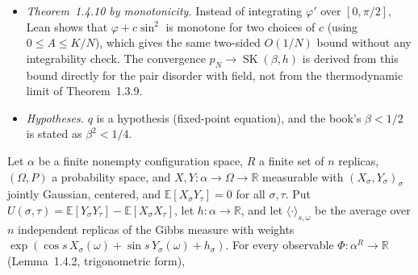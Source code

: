 \begin{remark}
\begin{itemize}
\item \emph{Theorem~1.4.10 by monotonicity.} Instead of integrating $\varphi'$ over $[0,\pi/2]$, Lean shows that $\varphi+c\sin^2$ is monotone for two choices of $c$ (using $0\le A\le K/N$), which gives the same two-sided $O(1/N)$ bound without any integrability check. The convergence $p_N\to\operatorname{SK}(\beta,h)$ is derived from this bound directly for the pair disorder with field, not from the thermodynamic limit of Theorem~1.3.9.
\item \emph{Hypotheses.} $q$ is a hypothesis (fixed-point equation), and the book's $\beta<1/2$ is stated as $\beta^2<1/4$.
\end{itemize}
\end{remark}

\begin{lemma}\label{lem:sg-tal:replica-deriv}
  \leanok
{}
Let $\alpha$ be a finite nonempty configuration space, $R$ a finite set of $n$ replicas, $(\Omega,P)$ a probability space, and $X, Y : \alpha \to \Omega \to \mathbb{R}$ measurable with $(X_\sigma, Y_\sigma)_\sigma$ jointly Gaussian, centered, and $\mathbb{E}[X_\sigma Y_\tau] = 0$ for all $\sigma,\tau$.
Put $U(\sigma,\tau) = \mathbb{E}[Y_\sigma Y_\tau] - \mathbb{E}[X_\sigma X_\tau]$, let $h : \alpha \to \mathbb{R}$, and let $\langle\cdot\rangle_{s,\omega}$ be the average over $n$ independent replicas of the Gibbs measure with weights $\exp(\cos s\, X_\sigma(\omega) + \sin s\, Y_\sigma(\omega) + h_\sigma)$.
For every observable $\Phi : \alpha^R \to \mathbb{R}$ (Lemma~1.4.2, trigonometric form),

\end{lemma}
